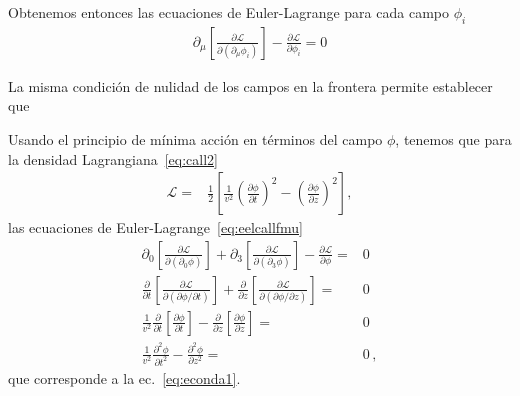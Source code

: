 \begin{frame}
Obtenemos entonces las ecuaciones de Euler-Lagrange para cada campo $\phi_i$
\begin{align}
\label{eq:eelcallfmu}
  \partial_{\mu} \left[ \frac{\partial\mathcal{L}}{\partial(\partial_{\mu}\phi_i)}\right]-\frac{\partial\mathcal{L}}{\partial\phi_i}=0
\end{align}

La misma condición de nulidad de los campos en la frontera permite establecer que 
\end{frame}

Usando el principio de mínima acción en términos del campo $\phi$, tenemos que para la densidad Lagrangiana~\eqref{eq:call2}
\begin{align}
  \mathcal{L}=&\frac{1}{2}  \left[
  \frac{1}{v^2}\left(\frac{\partial\phi}{\partial t}\right)^2-\left(\frac{\partial\phi}{\partial z}\right)^2
\right],
\end{align}
las ecuaciones de Euler-Lagrange~\eqref{eq:eelcallfmu}
\begin{align}
  \partial_0\left[\frac{\partial\mathcal{L}}{\partial(\partial_0\phi)}\right]+
\partial_3\left[\frac{\partial\mathcal{L}}{\partial(\partial_3\phi)}\right]
-\frac{\partial\mathcal{L}}{\partial\phi}=&0\nonumber\\
  \frac{\partial}{\partial t}\left[\frac{\partial\mathcal{L}}{\partial(\partial\phi/\partial t)}\right]+
\frac{\partial}{\partial z}\left[\frac{\partial\mathcal{L}}{\partial(\partial\phi/\partial z)}\right]
=&0\nonumber\\
 \frac{1}{v^2}\frac{\partial}{\partial t}\left[\frac{\partial\phi}{\partial t}\right]
-\frac{\partial}{\partial z}\left[\frac{\partial\phi}{\partial z}\right]=&0\nonumber\\
 \frac{1}{v^2}\frac{\partial^2\phi}{\partial t^2}-\frac{\partial^2\phi}{\partial z^2}=&0\,,
\end{align}
que corresponde a la ec.~\eqref{eq:econda1}.


